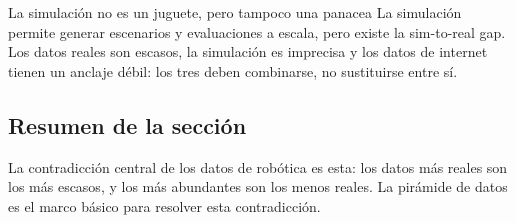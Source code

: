 \begin{warningbox}{La simulación no es un juguete, pero tampoco una panacea}
La simulación permite generar escenarios y evaluaciones a escala, pero existe la sim-to-real gap. Los datos reales son escasos, la simulación es imprecisa y los datos de internet tienen un anclaje débil: los tres deben combinarse, no sustituirse entre sí.
\end{warningbox}

\subsection{Resumen de la sección}

La contradicción central de los datos de robótica es esta: los datos más reales son los más escasos, y los más abundantes son los menos reales. La pirámide de datos es el marco básico para resolver esta contradicción.

